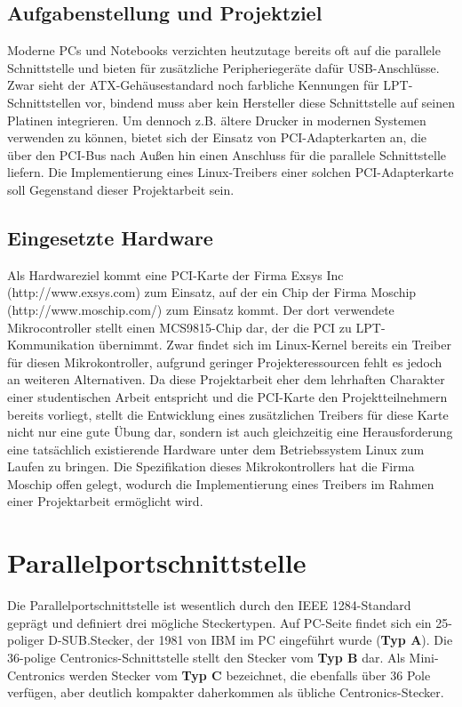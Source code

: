 \documentclass[a4paper,11pt]{article}
\begin{document}
 
\subsection{Aufgabenstellung und Projektziel}

Moderne PCs und Notebooks verzichten heutzutage bereits oft auf die parallele Schnittstelle und bieten für zusätzliche Peripheriegeräte dafür USB-Anschlüsse. Zwar sieht der ATX-Gehäusestandard noch farbliche Kennungen für LPT-Schnittstellen vor, bindend muss aber kein Hersteller diese Schnittstelle auf seinen Platinen integrieren. Um dennoch z.B. ältere Drucker in modernen Systemen verwenden zu können, bietet sich der Einsatz von PCI-Adapterkarten an, die über den PCI-Bus nach Außen hin einen Anschluss für die parallele Schnittstelle liefern. Die Implementierung eines Linux-Treibers einer solchen PCI-Adapterkarte soll Gegenstand dieser Projektarbeit sein. 

\subsection{Eingesetzte Hardware}  

Als Hardwareziel kommt eine PCI-Karte der Firma Exsys Inc (http://www.exsys.com) zum Einsatz, auf der ein Chip der Firma Moschip (http://www.moschip.com/) zum Einsatz kommt. Der dort verwendete Mikrocontroller stellt einen MCS9815-Chip dar, der die PCI zu LPT-Kommunikation übernimmt. Zwar findet sich im Linux-Kernel bereits ein Treiber für diesen Mikrokontroller, aufgrund geringer Projekteressourcen fehlt es jedoch an weiteren Alternativen. Da diese Projektarbeit eher dem lehrhaften Charakter einer studentischen Arbeit entspricht und die PCI-Karte den Projektteilnehmern bereits vorliegt, stellt die Entwicklung eines zusätzlichen Treibers für diese Karte nicht nur eine gute Übung dar, sondern ist auch gleichzeitig eine Herausforderung eine tatsächlich existierende Hardware unter dem Betriebssystem Linux zum Laufen zu bringen. Die Spezifikation dieses Mikrokontrollers hat die Firma Moschip offen gelegt, wodurch die Implementierung eines Treibers im Rahmen einer Projektarbeit ermöglicht wird.    


\section{Parallelportschnittstelle}

Die Parallelportschnittstelle ist wesentlich durch den IEEE 1284-Standard geprägt und definiert drei mögliche Steckertypen. Auf PC-Seite findet sich ein 25-poliger D-SUB.Stecker, der 1981 von IBM im PC eingeführt wurde (\textbf{Typ A}). Die 36-polige Centronics-Schnittstelle stellt den Stecker vom \textbf{Typ B} dar. Als Mini-Centronics werden Stecker vom \textbf{Typ C} bezeichnet, die ebenfalls über 36 Pole verfügen, aber deutlich kompakter daherkommen als übliche Centronics-Stecker. 
\end{document}

